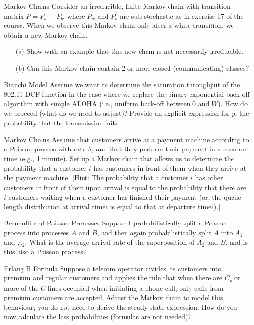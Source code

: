 \begin{problem}{Markov Chains}
Consider an irreducible, finite Markov chain with transition matrix $P = P_w + P_b$, where $P_w$ and $P_b$ are sub-stochastic as in exercise 17 of the course. When we observe this Markov chain only after a white transition, we obtain a new Markov chain. 
\begin{itemize}
    \item[(a)] Show with an example that this new chain is not necessarily irreducible.
    \item[(b)] Can this Markov chain contain 2 or more closed (communicating) classes?
\end{itemize}
\end{problem}

\begin{problem}{Bianchi Model}
Assume we want to determine the saturation throughput of the 802.11 DCF function in the case where we replace the binary exponential back-off algorithm with simple ALOHA (i.e., uniform back-off between 0 and $W$). How do we proceed (what do we need to adjust)? Provide an explicit expression for $p$, the probability that the transmission fails.
\end{problem}

\begin{problem}{Markov Chains}
Assume that customers arrive at a payment machine according to a Poisson process with rate $\lambda$, and that they perform their payment in a constant time (e.g., 1 minute). Set up a Markov chain that allows us to determine the probability that a customer $i$ has customers in front of them when they arrive at the payment machine. [Hint: The probability that a customer $i$ has other customers in front of them upon arrival is equal to the probability that there are $i$ customers waiting when a customer has finished their payment (or, the queue length distribution at arrival times is equal to that at departure times).]
\end{problem}

\begin{problem}{Bernoulli and Poisson Processes}
Suppose I probabilistically split a Poisson process into processes $A$ and $B$, and then again probabilistically split $A$ into $A_1$ and $A_2$. What is the average arrival rate of the superposition of $A_2$ and $B$, and is this also a Poisson process?
\end{problem}

\begin{problem}{Erlang B Formula}
Suppose a telecom operator divides its customers into premium and regular customers and applies the rule that when there are $C_p$ or more of the $C$ lines occupied when initiating a phone call, only calls from premium customers are accepted. Adjust the Markov chain to model this behaviour; you do not need to derive the steady state expression. How do you now calculate the loss probabilities (formulas are not needed)?
\end{problem}